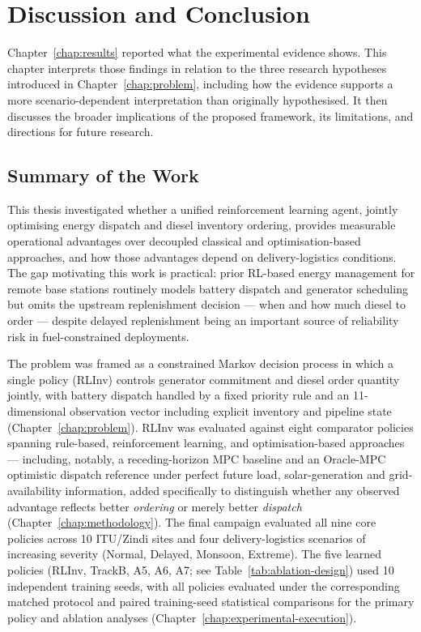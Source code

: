 \chapter{Discussion and Conclusion}
\label{chap:conclusion}
\setlength{\emergencystretch}{1.5em}

Chapter~\ref{chap:results} reported what the experimental evidence
shows. This chapter interprets those findings in relation to the three
research hypotheses introduced in
Chapter~\ref{chap:problem}, including how the evidence supports a more
scenario-dependent interpretation than originally hypothesised. It then
discusses the broader implications of the proposed framework, its
limitations, and directions for future research.

\section{Summary of the Work}
\label{sec:conclusion_summary}

This thesis investigated whether a unified reinforcement learning
agent, jointly optimising energy dispatch and diesel inventory
ordering, provides measurable operational advantages over decoupled
classical and optimisation-based approaches, and how those advantages
depend on delivery-logistics conditions. The gap motivating this work is
practical: prior RL-based energy management for remote base stations
routinely models battery dispatch and generator scheduling but omits
the upstream replenishment decision --- when and how much diesel to
order --- despite delayed replenishment being an important source of
reliability risk in fuel-constrained deployments.

The problem was framed as a constrained Markov decision process in
which a single policy (RLInv) controls generator commitment and diesel
order quantity jointly, with battery dispatch handled by a fixed
priority rule and an 11-dimensional observation vector including
explicit inventory and pipeline state (Chapter~\ref{chap:problem}).
RLInv was evaluated against eight comparator policies spanning
rule-based, reinforcement learning, and optimisation-based approaches ---
including, notably, a receding-horizon MPC baseline and an
Oracle-MPC optimistic dispatch reference under perfect future load, solar-generation and grid-availability information, added specifically to distinguish whether any
observed advantage reflects better \emph{ordering} or merely better
\emph{dispatch} (Chapter~\ref{chap:methodology}). The final campaign
evaluated all nine core policies across 10 ITU/Zindi sites and four
delivery-logistics scenarios of increasing severity (Normal, Delayed,
Monsoon, Extreme). The five learned policies (RLInv, TrackB, A5, A6,
A7; see Table~\ref{tab:ablation-design}) used 10 independent training
seeds, with all policies evaluated
under the corresponding matched protocol and paired training-seed
statistical comparisons for the primary policy and ablation analyses
(Chapter~\ref{chap:experimental-execution}).

